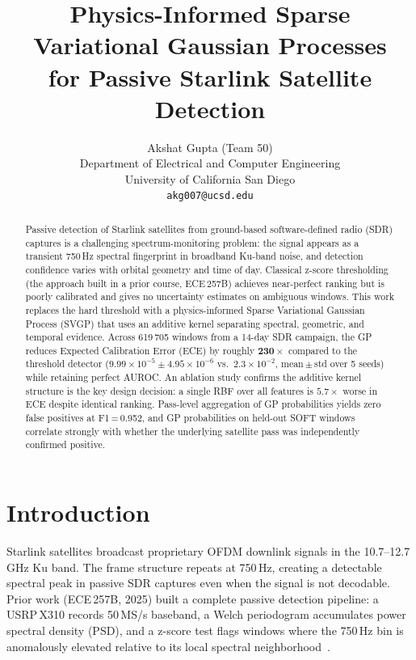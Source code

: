 \documentclass{article}
\title{Physics-Informed Sparse Variational Gaussian Processes\\
for Passive Starlink Satellite Detection}
\author{%
  Akshat Gupta \quad (Team 50)\\
  Department of Electrical and Computer Engineering\\
  University of California San Diego\\
  \texttt{akg007@ucsd.edu}
}
\begin{document}
\maketitle

\begin{abstract}
Passive detection of Starlink satellites from ground-based software-defined radio
(SDR) captures is a challenging spectrum-monitoring problem: the signal appears as a
transient 750\,Hz spectral fingerprint in broadband Ku-band noise, and detection
confidence varies with orbital geometry and time of day.
Classical z-score thresholding (the approach built in a prior course, ECE\,257B)
achieves near-perfect ranking but is poorly calibrated and gives no uncertainty
estimates on ambiguous windows.
This work replaces the hard threshold with a physics-informed Sparse Variational
Gaussian Process (SVGP) that uses an additive kernel separating spectral,
geometric, and temporal evidence.
Across 619\,705 windows from a 14-day SDR campaign, the GP reduces Expected
Calibration Error (ECE) by roughly $\mathbf{230\times}$ compared to the threshold
detector ($9.99\!\times\!10^{-5}\!\pm\!4.95\!\times\!10^{-6}$ vs.\ $2.3\!\times\!10^{-2}$, mean\,$\pm$\,std over 5 seeds) while retaining perfect AUROC.
An ablation study confirms the additive kernel structure is the key design decision:
a single RBF over all features is $5.7\times$ worse in ECE despite identical ranking.
Pass-level aggregation of GP probabilities yields zero false positives at F1\,=\,0.952,
and GP probabilities on held-out SOFT windows correlate strongly with whether the
underlying satellite pass was independently confirmed positive.
\end{abstract}

\section{Introduction}

Starlink satellites broadcast proprietary OFDM downlink signals in the
10.7--12.7\,GHz Ku band. The frame structure repeats at 750\,Hz, creating
a detectable spectral peak in passive SDR captures even when the signal is not
decodable. Prior work (ECE\,257B, 2025) built a complete passive detection
pipeline: a USRP\,X310 records 50\,MS/s baseband, a Welch periodogram accumulates
power spectral density (PSD), and a z-score test flags windows where the 750\,Hz
bin is anomalously elevated relative to its local spectral neighborhood~\cite{prior257b}.
\end{document}
